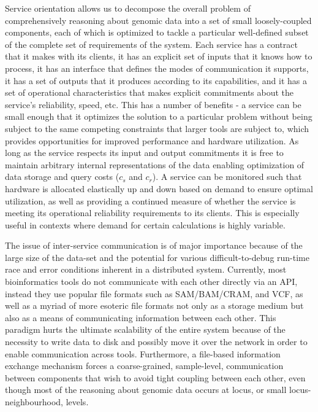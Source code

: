 Service orientation\autocite{erl2005service} allows us to decompose the overall problem of comprehensively reasoning about genomic data into a set of small loosely-coupled components, each of which is optimized to tackle a particular well-defined subset of the complete set of requirements of the system. Each service has a contract that it makes with its clients, it has an explicit set of inputs that it knows how to process, it has an interface that defines the modes of communication it supports, it has a set of outputs that it produces according to its capabilities, and it has a set of operational characteristics that makes explicit commitments about the service's reliability, speed, etc\autocite{papazoglou2003service}. This has a number of benefits - a service can be small enough that it optimizes the solution to a particular problem without being subject to the same competing constraints that larger tools are subject to, which provides opportunities for improved performance and hardware utilization. As long as the service respects its input and output commitments it is free to maintain arbitrary internal representations of the data enabling optimization of data storage and query costs ($c_{s}$  and $c_{r}$). A service can be monitored such that hardware is allocated elastically up and down based on demand to ensure optimal utilization, as well as providing a continued measure of whether the service is meeting its operational reliability requirements to its clients\autocite{copil2013multi}. This is especially useful in contexts where demand for certain calculations is highly variable.

The issue of inter-service communication is of major importance because of the large size of the data-set and the potential for various difficult-to-debug run-time race and error conditions inherent in a distributed system\autocite{garcia1984debugging}. Currently, most bioinformatics tools do not communicate with each other directly via an API, instead they use popular file formats such as SAM/BAM/CRAM\autocite{li2009sequence,fritz2011efficient}, and VCF\autocite{danecek2011variant}, as well as a myriad of more esoteric file formats not only as a storage medium but also as a means of communicating information between each other. This paradigm hurts the ultimate scalability of the entire system because of the necessity to write data to disk and possibly move it over the network in order to enable communication across tools. Furthermore, a file-based information exchange mechanism forces a coarse-grained, sample-level, communication between components that wish to avoid tight coupling between each other, even though most of the reasoning about genomic data occurs at locus, or small locus-neighbourhood, levels\autocite{durbin1998biological}. 

